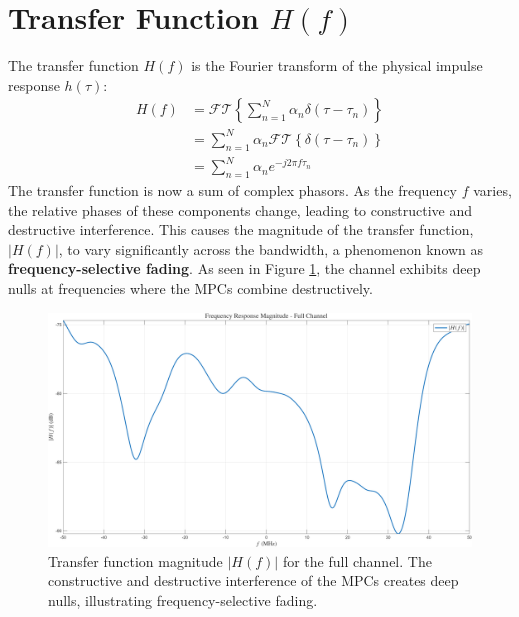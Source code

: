 \section{Transfer Function $H(f)$}
The transfer function $H(f)$ is the Fourier transform of the physical impulse response $h(\tau)$:
\begin{align}
	H(f) &= \mathcal{FT}\left\{ \sum_{n=1}^{N} \alpha_n \delta(\tau - \tau_n) \right\} \\
	&= \sum_{n=1}^{N} \alpha_n \mathcal{FT}\left\{ \delta(\tau - \tau_n) \right\} \\
	&= \sum_{n=1}^{N} \alpha_n e^{-j2\pi f \tau_n}
	\label{eq:full_transfer_function_wide}
\end{align}
The transfer function is now a sum of complex phasors. As the frequency $f$ varies, the relative phases of these components change, leading to constructive and destructive interference. This causes the magnitude of the transfer function, $|H(f)|$, to vary significantly across the bandwidth, a phenomenon known as \textbf{frequency-selective fading}. As seen in Figure \ref{fig:Hf_full}, the channel exhibits deep nulls at frequencies where the MPCs combine destructively.

\begin{figure}[h!]
	\centering
	\includegraphics[width=\linewidth]{"content/4-images/Frequency Response H(f) - Full Channel.png"}
	\caption{Transfer function magnitude $|H(f)|$ for the full channel. The constructive and destructive interference of the MPCs creates deep nulls, illustrating frequency-selective fading.}
	\label{fig:Hf_full}
\end{figure}

